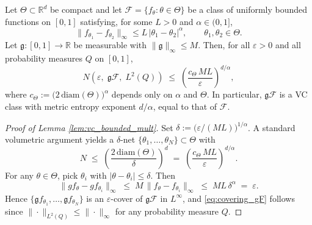 \documentclass{article}
\begin{document}
\begin{lemma}	\label{lem:vc_bounded_mult}
	Let $\Theta \subset \mathbb{R}^d$ be compact and let $\mathcal{F} = \{f_\theta : \theta \in \Theta\}$
	be a class of uniformly bounded functions on $[0,1]$ satisfying, for some $L > 0$
	and $\alpha \in (0,1]$,
	\begin{equation}
		\label{eq:holder_param}
		\|f_{\theta_1} - f_{\theta_2}\|_\infty \leq L\,|\theta_1 - \theta_2|^\alpha,
		\qquad \theta_1, \theta_2 \in \Theta.
	\end{equation}
	Let $\mathfrak g : [0,1] \to \mathbb{R}$ be measurable with $\|\mathfrak g\|_\infty \leq M$. Then, for all
	$\varepsilon > 0$ and all probability measures $Q$ on $[0,1]$,
	\begin{equation}
		\label{eq:covering_gF}
		N\!\left(\varepsilon,\; \mathfrak g\mathcal{F},\; L^2(Q)\right)
		\;\leq\;
		\left(\frac{c_\Theta\, ML}{\varepsilon}\right)^{d/\alpha},
	\end{equation}
	where $c_\Theta := \bigl(2\,\mathrm{diam}(\Theta)\bigr)^\alpha$ depends only on
	$\alpha$ and $\Theta$.
	In particular, $\mathfrak g\mathcal{F}$ is a VC class with metric entropy exponent $d/\alpha$,
	equal to that of $\mathcal{F}$.
\end{lemma}

\begin{proof}[Proof of Lemma \ref{lem:vc_bounded_mult}]
	Set $\delta := \bigl(\varepsilon/(ML)\bigr)^{1/\alpha}$.
	A standard volumetric argument yields a $\delta$-net
	$\{\theta_1,\ldots,\theta_N\} \subset \Theta$ with
	\[
	N \;\leq\; \left(\frac{2\,\mathrm{diam}(\Theta)}{\delta}\right)^d
	\;=\; \left(\frac{c_\Theta\,ML}{\varepsilon}\right)^{d/\alpha}.
	\]
	For any $\theta \in \Theta$, pick $\theta_i$ with $|\theta - \theta_i| \leq \delta$. Then
	\[
	\|gf_\theta - gf_{\theta_i}\|_\infty
	\;\leq\; M\,\|f_\theta - f_{\theta_i}\|_\infty
	\;\leq\; ML\,\delta^\alpha
	\;=\; \varepsilon.
	\]
	Hence $\{\mathfrak gf_{\theta_1},\ldots,\mathfrak gf_{\theta_N}\}$ is an $\varepsilon$-cover of $\mathfrak g\mathcal{F}$
	in $L^\infty$, and \eqref{eq:covering_gF} follows since
	$\|\cdot\|_{L^2(Q)} \leq \|\cdot\|_\infty$ for any probability measure $Q$.
\end{proof}
\end{document}
